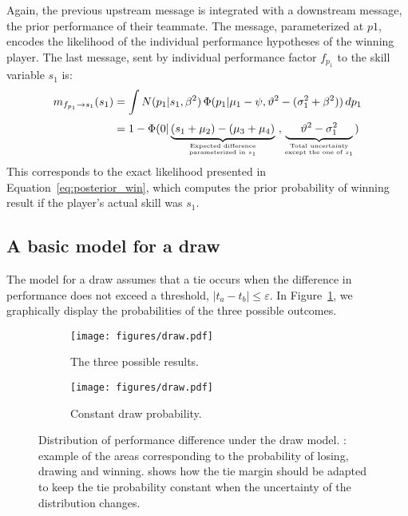 \documentclass[article]{jss}
\newcommand\hfrac[2]{\genfrac{}{}{0pt}{}{#1}{#2}} %
\begin{document}
%
Again, the previous upstream message is integrated with a downstream message, the prior performance of their teammate. 
The message, parameterized at $p1$, encodes the likelihood of the individual performance hypotheses of the winning player. 
The last message, sent by individual performance factor $f_{p_1}$ to the skill variable $s_1$ is:
%
\begin{equation}%
\begin{split}
m_{f_{p_1} \rightarrow s_1}(s_1) & = \int N(p_1| s_1, \beta^2) \, \Phi(p_1| \mu_1-\psi, \vartheta^2 - (\sigma_1^2 + \beta^2)) \, dp_1 \\[0.1cm]
& = 1 - \Phi(0 | \underbrace{(s_1 + \mu_2) - (\mu_3 + \mu_4)}_{\hfrac{\text{Expected difference}}{\text{parameterized in $s_1$}} } \ , \underbrace{\ \ \ \ \vartheta^2 - \sigma_1^2 \ \ \ \ }_{\hfrac{\text{Total uncertainty}}{\text{except the one of $s_1$}}})\end{split}
\end{equation}
%
This corresponds to the exact likelihood presented in Equation~\ref{eq:posterior_win}, which computes the prior probability of winning result if the player's actual skill was $s_1$. 

\subsection{A basic model for a draw} \label{sec:empate}

The model for a draw assumes that a tie occurs when the difference in performance does not exceed a threshold, $|t_a - t_b| \leq \varepsilon$. 
In Figure~\ref{fig:draw_a}, we graphically display the probabilities of the three possible outcomes. 
%
\begin{figure}[ht!]
\centering
\begin{subfigure}[t]{0.48\textwidth}
  \texttt{[image: figures/draw.pdf]} 
  \caption{The three possible results.}
  \label{fig:draw_a}
\end{subfigure}
\begin{subfigure}[t]{0.48\textwidth}
  \texttt{[image: figures/draw.pdf]}
  \caption{Constant draw probability.}
  \label{fig:draw_b}
\end{subfigure}
\caption{Distribution of performance difference under the draw model. 
: example of the areas corresponding to the probability of losing, drawing and winning. 
 shows how the tie margin should be adapted to keep the tie probability constant when the uncertainty of the distribution changes. 
}
\label{fig:draw}
\end{figure}
\end{document}
